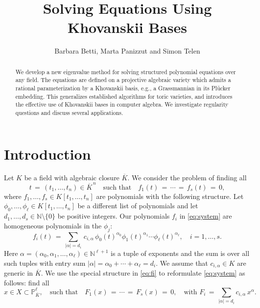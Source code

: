 \documentclass[12pt]{article}
\title{\bf Solving Equations Using Khovanskii Bases}
\author{Barbara Betti, Marta Panizzut and Simon Telen}
\date{}
\theoremstyle{definition}
\theoremstyle{remark}
\begin{document}
\maketitle

\begin{abstract}
    We develop a new eigenvalue method for solving structured polynomial equations over any field. The equations are defined on a projective algebraic variety which admits a rational parameterization by a Khovanskii basis, e.g., a Grassmannian in its Pl\"ucker embedding. This generalizes established algorithms for toric varieties, and introduces the effective use of Khovanskii bases in computer algebra. We investigate regularity questions and discuss several applications. 
\end{abstract}


\section{Introduction} \label{sec:1}
Let $K$ be a field with algebraic closure $\overline{K}$. We consider the problem of finding all 
\begin{equation} \label{eq:system}
    t \,= \, (t_1, \ldots, t_n) \in \overline{K}^{\,n} \quad \text{such that} \quad f_1(t) \, = \, \cdots \, = \, f_s(t) \, = \, 0, 
\end{equation} 
where $f_1, \ldots, f_s \in K[t_1, \ldots, t_n]$ are polynomials with the following structure. Let $\phi_0, \ldots, \phi_\ell \in K[t_1,\ldots, t_n]$ be a different list of polynomials and let $d_1, \ldots, d_s \in \mathbb{N} \setminus \{0\}$ be positive integers. Our polynomials $f_i$ in \eqref{eq:system} are homogeneous polynomials in the $\phi_j$: 
\begin{equation} \label{eq:fi}
    f_i(t) \, = \, \sum_{|\alpha| = d_i} \,  c_{i,\alpha} \, \phi_0(t)^{\alpha_0} \phi_1(t)^{\alpha_1} \cdots \phi_\ell(t)^{\alpha_\ell}, \quad i = 1, \ldots, s. 
\end{equation} 
Here $\alpha = (\alpha_0, \alpha_1, \ldots, \alpha_\ell) \in \mathbb{N}^{\ell + 1}$ is a tuple of exponents and the sum is over all such tuples with entry sum $|\alpha| = \alpha_0 + \cdots + \alpha_\ell = d_i$. We assume that $c_{i,\alpha} \in K$ are generic in $\overline{K}$. We use the special structure in \eqref{eq:fi} to reformulate \eqref{eq:system} as follows: find all  
\begin{equation} \label{eq:homsystem}
    x \in X \subset \mathbb{P}_{\overline{K}}^\ell, \quad \text{such that} \quad F_1(x) \, = \, \cdots \, = \, F_s(x) \, = \, 0,  \quad \text{with } F_i \, = \, \sum_{|\alpha| = d_i} c_{i,\alpha} \, x^\alpha. 
\end{equation} 
\end{document}
